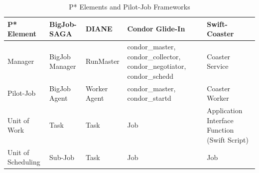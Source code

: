 \documentclass[conference,final]{IEEEtran}
\newcommand{\up}{\vspace*{-1em}}
\begin{document}



\begin{table}[t]
\centering
\begin{tabular}{|p{2.5cm}|p{3cm}|p{3cm}|p{3cm}|p{3cm}|}
\hline
\textbf{P* Element} &\textbf{BigJob-SAGA} &\textbf{DIANE} &\textbf{Condor 
Glide-In} &\textbf{Swift-Coaster}  \\
\hline
Manager &BigJob Manager & RunMaster & condor\_master, condor\_collector, condor\_negotiator, condor\_schedd &Coaster Service\\ 
\hline
Pilot-Job &BigJob Agent  & Worker Agent &condor\_master, condor\_startd &Coaster Worker\\
\hline
Unit of Work &Task &Task &Job &Application Interface Function (Swift Script)\\
\hline
Unit of Scheduling &Sub-Job &Task &Job &Job\\
\hline
\end{tabular}
\caption{P* Elements and Pilot-Job Frameworks\up} \label{table:bigjob-saga-diane}
\end{table}
\end{document}

